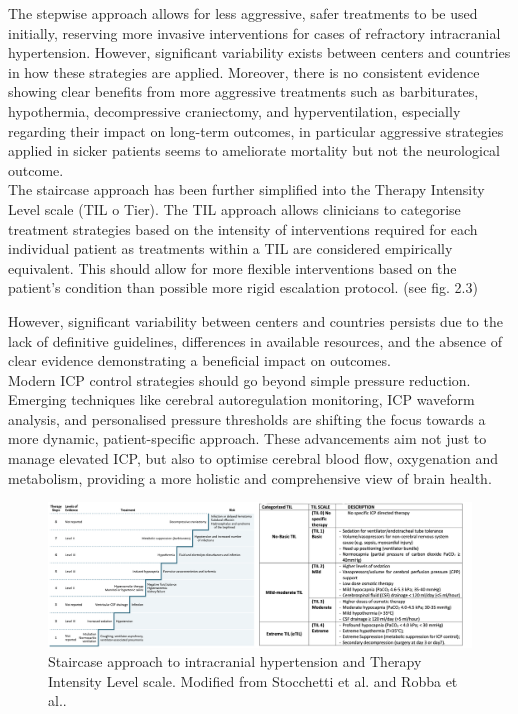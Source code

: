 The stepwise approach allows for less aggressive, safer treatments to be used initially, reserving more invasive interventions for cases of refractory intracranial hypertension. However, significant variability exists between centers and countries in how these strategies are applied. Moreover, there is no consistent evidence showing clear benefits from more aggressive treatments such as barbiturates, hypothermia, decompressive craniectomy, and hyperventilation, especially regarding their impact on long-term outcomes, in particular aggressive strategies applied in sicker patients seems to ameliorate mortality but not the neurological outcome\cite{robbaTreatmentsIntracranialHypertension2023a}.\\

The staircase approach has been further simplified into the Therapy Intensity Level scale (TIL o Tier)\cite{zuercherReliabilityValidityTherapy2016}. The TIL approach allows clinicians to categorise treatment strategies based on the intensity of interventions required for each individual patient as treatments within a TIL are considered empirically equivalent\cite{hawrylukManagementAlgorithmPatients2019a}. This should allow for more flexible interventions based on the patient’s condition than possible more rigid escalation protocol. (see fig. 2.3)

However, significant variability between centers and countries persists due to the lack of definitive guidelines, differences in available resources, and the absence of clear evidence demonstrating a beneficial impact on outcomes\cite{robbaTreatmentsIntracranialHypertension2023a}.\\

Modern ICP control strategies should go beyond simple pressure reduction. Emerging techniques like cerebral autoregulation monitoring, ICP waveform analysis, and personalised pressure thresholds are shifting the focus towards a more dynamic, patient-specific approach. These advancements aim not just to manage elevated ICP, but also to optimise cerebral blood flow, oxygenation and metabolism, providing a more holistic and comprehensive view of brain health.

\begin{figure}[h]
    \centering
    \includegraphics[width=1\textwidth]{pictures/fig4.png}
    \caption{Staircase approach to intracranial hypertension and Therapy Intensity Level scale. Modified from Stocchetti et al.\cite{stocchettiTraumaticIntracranialHypertension2014a} and Robba et al.\cite{robbaTreatmentsIntracranialHypertension2023a}.}
\end{figure}

